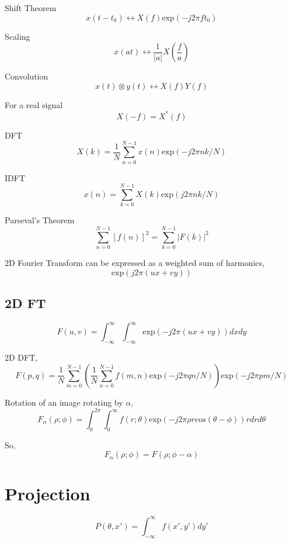 \documentclass[12pt]{article}
\begin{document}
Shift Theorem
\begin{equation}
    x(t-t_0) \leftrightarrow X(f)\textrm{exp}(-j2\pi ft_0)
\end{equation}

Scaling
\begin{equation}
    x(at) \leftrightarrow \frac{1}{ |a| } X \left(\frac{f}{a}\right)
\end{equation}

Convolution
\begin{equation}
    x(t) \otimes y(t) \leftrightarrow X(f)Y(f)
\end{equation}

For a real signal
\begin{equation}
    X(-f) = X^*(f)
\end{equation}

DFT
\begin{equation}
    X(k) = \frac{1}{N} \sum_{n=0}^{N-1} x(n) \textrm{exp}(-j2\pi nk / N)
\end{equation}

IDFT
\begin{equation}
    x(n) = \sum_{k=0}^{N-1} X(k) \textrm{exp} (j2\pi nk/N)
\end{equation}

Parseval's Theorem
\begin{equation}
    \sum_{n=0}^{N-1} [f(n)]^2 = \sum_{k=0}^{N-1}|F(k)|^2
\end{equation}

2D Fourier Transform can be expressed as a weighted sum of harmonics,
\begin{equation}
    \textrm{exp}(j2\pi (ux+vy))
\end{equation}

\subsection{2D FT}

\begin{equation}
    F(u,v) = \int_{-\infty}^{\infty} \int_{-\infty}^{\infty} \textrm{exp} (-j2\pi (ux+vy))dx dy
\end{equation}

2D DFT,
\begin{equation}
    F(p,q) = \frac{1}{N} \sum_{m=0}^{N-1} \left(\frac{1}{N} \sum_{n=0}^{N-1} f(m,n) \textrm{exp} (-j2\pi qn/N)\textrm{}\right) \textrm{exp} (-j2\pi pm / N)
\end{equation}

Rotation of an image rotating by $\alpha$,
\begin{equation}
    F_\alpha (\rho;\phi) = \int_0^{2\pi} \int_0^{\infty} f(r;\theta) \textrm{exp} (-j2\pi\rho r \textrm{cos}(\theta-\phi))r drd\theta
\end{equation}

So,
\begin{equation}
    F_\alpha (\rho;\phi) = F(\rho;\phi-\alpha)
\end{equation}

\section{Projection}

\begin{equation}
    P(\theta,x') = \int_{-\infty}^\infty f(x',y')dy'
\end{equation}
\end{document}
